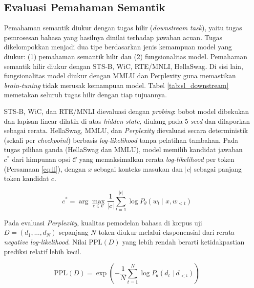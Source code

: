 \subsection{Evaluasi Pemahaman Semantik}
\label{sub:sl_evaluasi}

Pemahaman semantik diukur dengan tugas hilir (\textit{downstream task}), yaitu tugas pemrosesan bahasa yang hasilnya dinilai terhadap jawaban acuan. Tugas dikelompokkan menjadi dua tipe berdasarkan jenis kemampuan model yang diukur: (1) pemahaman semantik hilir dan (2) fungsionalitas model. Pemahaman semantik hilir diukur dengan  STS-B, WiC, RTE/MNLI, HellaSwag. Di sisi lain, fungsionalitas model diukur dengan MMLU dan Perplexity guna memastikan \textit{brain-tuning} tidak merusak kemampuan model. Tabel \ref{tab:sl_downstream} memetakan seluruh tugas hilir dengan tiap tujuannya. %



STS-B, WiC, dan RTE/MNLI dievaluasi dengan \textit{probing}: bobot model dibekukan dan lapisan linear dilatih di atas \textit{hidden state}, diulang pada 5 \textit{seed} dan dilaporkan sebagai rerata. HellaSwag, MMLU, dan \textit{Perplexity} dievaluasi secara deterministik (sekali per \textit{checkpoint}) berbasis \textit{log-likelihood} tanpa pelatihan tambahan. Pada tugas pilihan ganda (HellaSwag dan MMLU), model memilih kandidat jawaban $c^*$ dari himpunan opsi $\mathcal{C}$ yang memaksimalkan rerata \textit{log-likelihood} per token (Persamaan \ref{eq:ll}), dengan $x$ sebagai konteks masukan dan $|c|$ sebagai panjang token kandidat $c$.

\begin{equation}
    c^* = \arg\max_{c \in \mathcal{C}} \frac{1}{|c|} \sum_{t=1}^{|c|} \log P_{\theta}(w_t \mid x, w_{<t})
    \label{eq:ll}
\end{equation}

Pada evaluasi \textit{Perplexity}, kualitas pemodelan bahasa di korpus uji $D = (d_1, \ldots, d_N)$ sepanjang $N$ token diukur melalui eksponensial dari rerata \textit{negative log-likelihood}. Nilai $\text{PPL}(D)$ yang lebih rendah berarti ketidakpastian prediksi relatif lebih kecil.

\begin{equation}
    \text{PPL}(D) = \exp\left( -\frac{1}{N} \sum_{t=1}^{N} \log P_{\theta}(d_t \mid d_{<t}) \right)
    \label{eq:ppl_w}
\end{equation}

